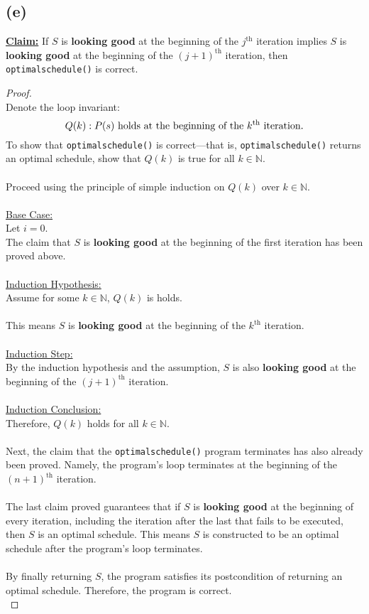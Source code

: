 \documentclass[12pt]{article}
\begin{document}
\subsection*{(e)}
\underline{\textbf{Claim:}} If \( S \) is \textbf{looking good} at the beginning of the \( j^{\text{th}} \) iteration implies \( S \) is \textbf{looking good} at the beginning of the \( (j + 1)^{\text{th}} \) iteration, then \texttt{optimalschedule()} is correct.
\begin{proof}
\leavevmode\\
    Denote the loop invariant:
    \[
        Q(k): P(s) \text{ holds at the beginning of the \( k ^{\text{th}} \) iteration.}
    \]
    To show that \texttt{optimalschedule()} is correct—that is, \texttt{optimalschedule()} returns an optimal schedule, show that \( Q(k) \) is true for all \( k \in \mathbb{N} \). \\
    \\
    Proceed using the principle of simple induction on \( Q(k) \) over \( k \in \mathbb{N} \). \\
    \\
    \underline{Base Case:} \\
    Let \( i = 0 \). \\
    The claim that \( S \) is \textbf{looking good} at the beginning of the first iteration has been proved above. \\
    \\
    \underline{Induction Hypothesis:} \\
    Assume for some \( k \in \mathbb{N} \), \( Q(k) \) is holds. \\
    \\
    This means \( S \) is \textbf{looking good} at the beginning of the \( k^{\text{th}} \) iteration. \\
    \\
    \underline{Induction Step:} \\
    By the induction hypothesis and the assumption, \( S \) is also \textbf{looking good} at the beginning of the \( (j + 1)^{\text{th}} \) iteration. \\
    \\
    \underline{Induction Conclusion:} \\
    Therefore, \( Q(k) \) holds for all \( k \in \mathbb{N} \). \\
    \\
    Next, the claim that the \texttt{optimalschedule()} program terminates has also already been proved. Namely, the program's loop terminates at the beginning of the \( (n + 1)^{\text{th}} \) iteration. \\
    \\
    The last claim proved guarantees that if \( S \) is \textbf{looking good} at the beginning of every iteration, including the iteration after the last that fails to be executed, then \( S \) is an optimal schedule. This means \( S \) is constructed to be an optimal schedule after the program's loop terminates. \\
    \\
    By finally returning \( S \), the program satisfies its postcondition of returning an optimal schedule. Therefore, the program is correct. \\
\end{proof}
\end{document}
